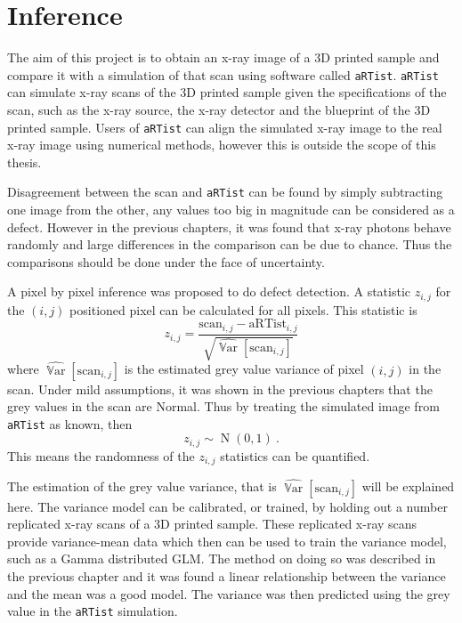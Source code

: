 \documentclass[12pt, a4paper]{memoir}
\DeclareMathOperator{\variance}{\mathbb{V}ar}
\DeclareMathOperator{\normal}{N}
\begin{document}
\chapter{Inference}

The aim of this project is to obtain an x-ray image of a 3D printed sample and compare it with a simulation of that scan using software called \texttt{aRTist}. \texttt{aRTist} can simulate x-ray scans of the 3D printed sample given the specifications of the scan, such as the x-ray source, the x-ray detector and the blueprint of the 3D printed sample. Users of \texttt{aRTist} can align the simulated x-ray image to the real x-ray image using numerical methods, however this is outside the scope of this thesis.

Disagreement between the scan and \texttt{aRTist} can be found by simply subtracting one image from the other, any values too big in magnitude can be considered as a defect. However in the previous chapters, it was found that x-ray photons behave randomly and large differences in the comparison can be due to chance. Thus the comparisons should be done under the face of uncertainty.

A pixel by pixel inference was proposed to do defect detection. A statistic $z_{i,j}$ for the $(i,j)$ positioned pixel can be calculated for all pixels. This statistic is
\begin{equation}
    z_{i,j} = 
    \dfrac{
        \text{scan}_{i,j} - \text{aRTist}_{i,j}
    }
    {
        \sqrt{\widehat{\variance}\left[\text{scan}_{i,j}\right]}
    }
\end{equation}
where $\widehat{\variance}\left[\text{scan}_{i,j}\right]$ is the estimated grey value variance of pixel $(i,j)$ in the scan. Under mild assumptions, it was shown in the previous chapters that the grey values in the scan are Normal. Thus by treating the simulated image from \texttt{aRTist} as known, then
\begin{equation}
z_{i,j}\sim \normal(0,1) \ .
\end{equation}
This means the randomness of the $z_{i,j}$ statistics can be quantified.

The estimation of the grey value variance, that is $\widehat{\variance}\left[\text{scan}_{i,j}\right]$ will be explained here. The variance model can be calibrated, or trained, by holding out a number replicated x-ray scans of a 3D printed sample. These replicated x-ray scans provide variance-mean data which then can be used to train the variance model, such as a Gamma distributed GLM. The method on doing so was described in the previous chapter and it was found a linear relationship between the variance and the mean was a good model. The variance was then predicted using the grey value in the \texttt{aRTist} simulation.
\end{document}
